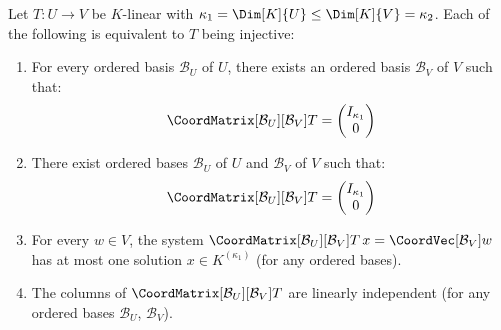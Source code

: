 \begin{theorem}
\label{thm:mat-inj}
    Let $T: U \to V$ be $K$-linear with $\kappa_1 = \Dim[K]{U} \leq \Dim[K]{V} = \kappa_2$.
    Each of the following is equivalent to $T$ being injective:
    \begin{enumerate}
        \item For every ordered basis $\mathcal{B}_U$ of $U$, there exists an ordered basis
              $\mathcal{B}_V$ of $V$ such that:
              \[
                  \CoordMatrix[\mathcal{B}_U][\mathcal{B}_V]{T}
                  = \begin{pmatrix} I_{\kappa_1} \\ 0 \end{pmatrix}
              \]
        \item There exist ordered bases $\mathcal{B}_U$ of $U$ and $\mathcal{B}_V$ of $V$
              such that:
              \[
                  \CoordMatrix[\mathcal{B}_U][\mathcal{B}_V]{T}
                  = \begin{pmatrix} I_{\kappa_1} \\ 0 \end{pmatrix}
              \]
        \item For every $w \in V$, the system
              $\CoordMatrix[\mathcal{B}_U][\mathcal{B}_V]{T}\, x = \CoordVec[\mathcal{B}_V]{w}$
              has at most one solution $x \in K^{(\kappa_1)}$ (for any ordered bases).
        \item The columns of $\CoordMatrix[\mathcal{B}_U][\mathcal{B}_V]{T}$ are linearly
              independent (for any ordered bases $\mathcal{B}_U$, $\mathcal{B}_V$).
    \end{enumerate}
\end{theorem}

